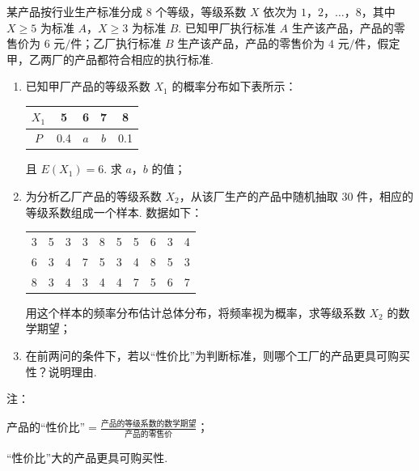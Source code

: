 \begin{problem}
某产品按行业生产标准分成 \(8\) 个等级，等级系数 \(X\) 依次为 \(1\)，\(2\)，\(\dots\)，\(8\)，其中 \(X\geqslant 5\) 为标准 \(A\)，\(X\geqslant 3\) 为标准 \(B\). 已知甲厂执行标准 \(A\) 生产该产品，产品的零售价为 \(6\text{ 元/件}\)；乙厂执行标准 \(B\) 生产该产品，产品的零售价为 \(4\text{ 元/件}\)，假定甲，乙两厂的产品都符合相应的执行标准.

\begin{enumerate}
\item 已知甲厂产品的等级系数 \(X_1\) 的概率分布如下表所示：

\begin{center}
\begin{tabular}{|c|c|c|c|c|}
\hline
\(X_1\) & 5 & 6 & 7 & 8 \\
\hline
\(P\) & 0.4 & \(a\) & \(b\) & 0.1 \\
\hline
\end{tabular}
\end{center}

且 \(E(X_1)=6\). 求 \(a\)，\(b\) 的值；
\item 为分析乙厂产品的等级系数 \(X_2\)，从该厂生产的产品中随机抽取 \(30\) 件，相应的等级系数组成一个样本. 数据如下：

\begin{center}
\begin{tabular}{cccccccccc}
3 & 5 & 3 & 3 & 8 & 5 & 5 & 6 & 3 & 4 \\
6 & 3 & 4 & 7 & 5 & 3 & 4 & 8 & 5 & 3 \\
8 & 3 & 4 & 3 & 4 & 4 & 7 & 5 & 6 & 7
\end{tabular}
\end{center}

用这个样本的频率分布估计总体分布，将频率视为概率，求等级系数 \(X_2\) 的数学期望；
\item 在前两问的条件下，若以“性价比”为判断标准，则哪个工厂的产品更具可购买性？说明理由.
\end{enumerate}

注：

\begin{circlelist}
\item 产品的“性价比”\(=\frac{\text{产品的等级系数的数学期望}}{\text{产品的零售价}}\)；
\item “性价比”大的产品更具可购买性.
\end{circlelist}
\end{problem}

